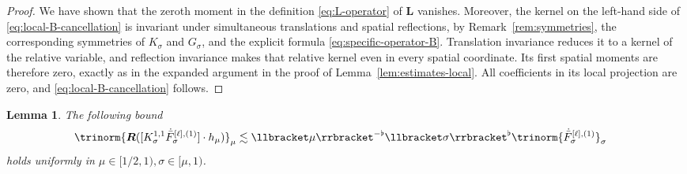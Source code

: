 \documentclass{article}
\numberwithin{equation}{section}
\theoremstyle{plain}
\newtheorem{lemma}[theorem]{Lemma}
\theoremstyle{definition}
\begin{document}
\begin{proof}
  We have shown that the zeroth moment in the definition
  \eqref{eq:L-operator} of $\boldsymbol L$ vanishes. Moreover, the kernel on the left-hand side of
  \eqref{eq:local-B-cancellation} is invariant under simultaneous
  translations and spatial reflections, by Remark~\ref{rem:symmetries}, the
  corresponding symmetries of \(K_\sigma\) and \(G_\sigma\), and the explicit
  formula \eqref{eq:specific-operator-B}.  Translation invariance reduces it
  to a kernel of the relative variable, and reflection invariance makes that
  relative kernel even in every spatial coordinate.  Its first spatial
  moments are therefore zero, exactly as in the expanded argument in the
  proof of Lemma~\ref{lem:estimates-local}.
  All coefficients in its local projection are zero, and
  \eqref{eq:local-B-cancellation} follows.
\end{proof}

\begin{lemma}
  \label{lem:estimates-remainder}The following bound
  \begin{align*}
    \trinorm{ \boldsymbol{R} ([K^{1, 1}_{\sigma}
    \dot{\bar{F}}_{\sigma}^{[\ell], (1)}] \cdot h_{\mu})
    }_{\mu}
    &\lesssim \llbracket \mu \rrbracket^{- \flat}
    \llbracket \sigma \rrbracket^{\flat}
    \trinorm{ \dot{\bar{F}}_{\sigma}^{[\ell], (1)}
    }_{\sigma}
  \end{align*}
  holds uniformly in $\mu \in [1 / 2, 1), \sigma \in [\mu, 1)$.
\end{lemma}
\end{document}
